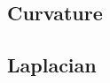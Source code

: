 
\subsection{Curvature}\label{sec:curvature-calculations}

\subsection{Laplacian}\label{sec:laplacian-calculations}

\newpage
